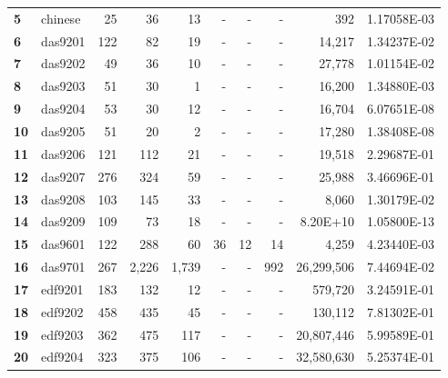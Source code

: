 \begin{longtable}{@{}llrrrrrrrc@{}}
\textbf{5}  & chinese  & 25                   & 36       & 13      & -    & -    & -     & 392                  & 1.17058E-03 \\
\textbf{6}  & das9201  & 122                  & 82       & 19      & -    & -    & -     & 14,217               & 1.34237E-02 \\
\textbf{7}  & das9202  & 49                   & 36       & 10      & -    & -    & -     & 27,778               & 1.01154E-02 \\
\textbf{8}  & das9203  & 51                   & 30       & 1       & -    & -    & -     & 16,200               & 1.34880E-03 \\
\textbf{9}  & das9204  & 53                   & 30       & 12      & -    & -    & -     & 16,704               & 6.07651E-08 \\
\textbf{10} & das9205  & 51                   & 20       & 2       & -    & -    & -     & 17,280               & 1.38408E-08 \\
\textbf{11} & das9206  & 121                  & 112      & 21      & -    & -    & -     & 19,518               & 2.29687E-01 \\
\textbf{12} & das9207  & 276                  & 324      & 59      & -    & -    & -     & 25,988               & 3.46696E-01 \\
\textbf{13} & das9208  & 103                  & 145      & 33      & -    & -    & -     & 8,060                & 1.30179E-02 \\
\textbf{14} & das9209  & 109                  & 73       & 18      & -    & -    & -     & 8.20E+10             & 1.05800E-13 \\
\textbf{15} & das9601  & 122                  & 288      & 60      & 36   & 12   & 14    & 4,259                & 4.23440E-03 \\
\textbf{16} & das9701  & 267                  & 2,226    & 1,739   & -    & -    & 992   & 26,299,506           & 7.44694E-02 \\
\textbf{17} & edf9201  & 183                  & 132      & 12      & -    & -    & -     & 579,720              & 3.24591E-01 \\
\textbf{18} & edf9202  & 458                  & 435      & 45      & -    & -    & -     & 130,112              & 7.81302E-01 \\
\textbf{19} & edf9203  & 362                  & 475      & 117     & -    & -    & -     & 20,807,446           & 5.99589E-01 \\
\textbf{20} & edf9204  & 323                  & 375      & 106     & -    & -    & -     & 32,580,630           & 5.25374E-01 \\

\end{longtable}
